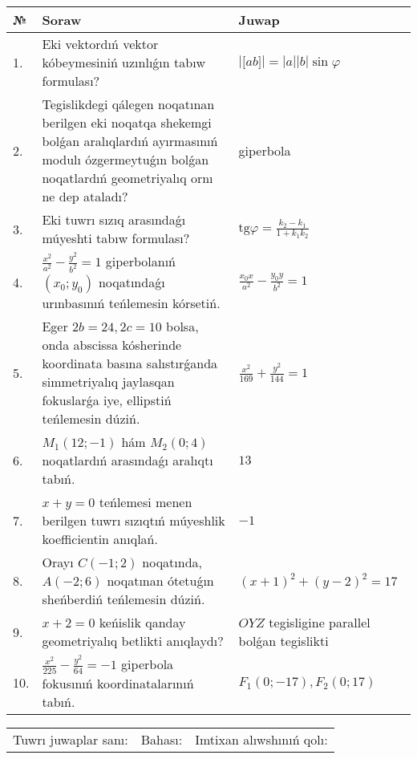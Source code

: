 \documentclass{article}
\begin{document}
\begin{tabular}{|m{0.7cm}|m{10cm}|m{4cm}|}
\hline
№ & Soraw & Juwap \\
\hline
1. & Eki vektordıń vektor kóbeymesiniń uzınlıǵın tabıw formulası? & $\left| \lbrack ab\rbrack \right|=|a||b|\sin\varphi$ \\
\hline
2. & Tegislikdegi qálegen noqatınan berilgen eki noqatqa shekemgi bolǵan aralıqlardıń ayırmasınıń modulı ózgermeytuǵın bolǵan noqatlardıń geometriyalıq ornı ne dep ataladı? & giperbola \\
\hline
3. & Eki tuwrı sızıq arasındaǵı múyeshti tabıw formulası? & $\text{tg}\varphi=\frac{k_2-k_1}{1+k_1k_2}$ \\
\hline
4. & $\frac{x^2}{a^2}-\frac{y^2}{b^2}=1$ giperbolanıń $(x_0;y_0)$ noqatındaǵı urınbasınıń teńlemesin kórsetiń. & $\frac{x_0x}{a^2}-\frac{y_0y}{b^2}=1$ \\
\hline
5. & Eger $2b=24, 2 c=10$ bolsa, onda abscissa kósherinde koordinata basına salıstırǵanda simmetriyalıq jaylasqan fokuslarǵa iye, ellipstiń teńlemesin dúziń. & $\frac{x^{2}}{169}+\frac{y^{2}}{144}=1$ \\
\hline
6. & $M_{1} (12;-1)$ hám $M_{2} (0;4)$ noqatlardıń arasındaǵı aralıqtı tabıń. & $13$ \\
\hline
7. & $x+y=0$ teńlemesi menen berilgen tuwrı sızıqtıń múyeshlik koefficientin anıqlań. & $- 1$ \\
\hline
8. & Orayı $C (-1;2)$ noqatında, $A (-2;6 )$ noqatınan ótetuǵın sheńberdiń teńlemesin dúziń. & $(x+1)^{2}+(y-2)^{2}=17$ \\
\hline
9. & $x+2=0$ keńislik qanday geometriyalıq betlikti anıqlaydı? &  $OYZ$ tegisligine parallel bolǵan tegislikti \\
\hline
10. & $\frac{x^{2}}{225}-\frac{y^{2}}{64}=-1$ giperbola fokusınıń koordinatalarınıń tabıń. & $F_{1}(0;-17), F_{2}(0;17)$ \\
\hline
\end{tabular}

\vspace{1cm}

\begin{tabular}{lll}
Tuwrı juwaplar sanı: \underline{\hspace{1.5cm}} & 
Bahası: \underline{\hspace{1.5cm}} & 
Imtixan alıwshınıń qolı: \underline{\hspace{2cm}} \\
\end{tabular}

\egroup
\end{document}
